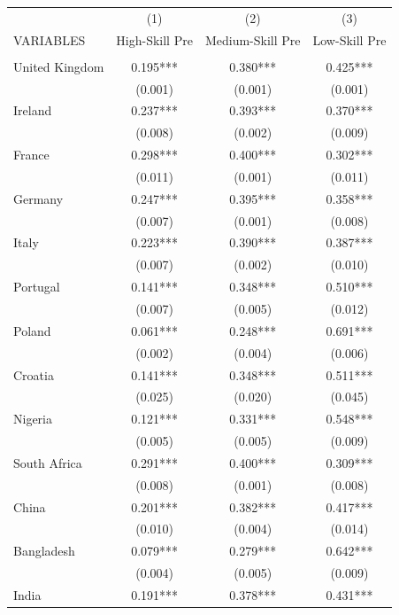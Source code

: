 \documentclass[12pt, a4paper]{article}
\begin{document}
\begin{table}[H]
    \centering
        \begin{tabularx}{\textwidth}{@{}lCCC@{}} \hline
         & (1) & (2) & (3) \\
        VARIABLES & High-Skill Pre & Medium-Skill Pre & Low-Skill Pre \\ \hline
         &  &  &  \\
        United Kingdom & 0.195*** & 0.380*** & 0.425*** \\
         & (0.001) & (0.001) & (0.001) \\
        Ireland & 0.237*** & 0.393*** & 0.370*** \\
         & (0.008) & (0.002) & (0.009) \\
        France & 0.298*** & 0.400*** & 0.302*** \\
         & (0.011) & (0.001) & (0.011) \\
        Germany & 0.247*** & 0.395*** & 0.358*** \\
         & (0.007) & (0.001) & (0.008) \\
        Italy & 0.223*** & 0.390*** & 0.387*** \\
         & (0.007) & (0.002) & (0.010) \\
        Portugal & 0.141*** & 0.348*** & 0.510*** \\
         & (0.007) & (0.005) & (0.012) \\
        Poland & 0.061*** & 0.248*** & 0.691*** \\
         & (0.002) & (0.004) & (0.006) \\
        Croatia & 0.141*** & 0.348*** & 0.511*** \\
         & (0.025) & (0.020) & (0.045) \\
        Nigeria & 0.121*** & 0.331*** & 0.548*** \\
         & (0.005) & (0.005) & (0.009) \\
        South Africa & 0.291*** & 0.400*** & 0.309*** \\
         & (0.008) & (0.001) & (0.008) \\
        China & 0.201*** & 0.382*** & 0.417*** \\
         & (0.010) & (0.004) & (0.014) \\
        Bangladesh & 0.079*** & 0.279*** & 0.642*** \\
         & (0.004) & (0.005) & (0.009) \\
        India & 0.191*** & 0.378*** & 0.431*** \\

\end{tabularx}
\end{table}
\end{document}
